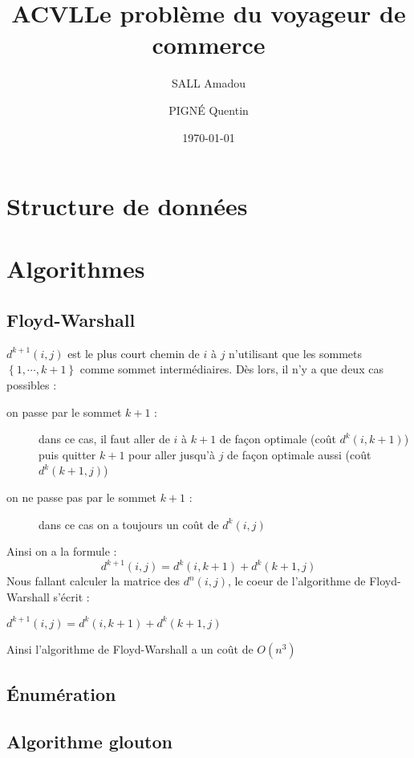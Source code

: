 \documentclass[11pt]{article}
\title{ACVL}
\title{Le problème du voyageur de commerce}
\author{SALL Amadou \and PIGN\'E Quentin }
\date{\today}
\newcommand{\set}[1]{\left\{#1\right\}}
\begin{document}
\maketitle

\section{Structure de données}
\section{Algorithmes}

\subsection*{Floyd-Warshall}
$d^{k+1}(i,j)$ est le plus court chemin de $i$ à $j$ n'utilisant que les sommets $\set{1,\cdots,k+1}$ comme sommet
intermédiaires. Dès lors, il n'y a que deux cas possibles :
\begin{description}
    \item[on passe par le sommet $k+1$ :]  dans ce cas, il faut aller de $i$ à $k+1$ de façon optimale (coût
  $d^{k}(i,k+1)$) puis quitter $k+1$ pour aller jusqu'à $j$ de façon optimale aussi (coût $d^{k}(k+1,j)$)
\item[on ne passe pas par le sommet $k+1$ :] dans ce cas on a toujours un coût de $d^{k}(i,j)$
\end{description}
Ainsi on a la formule :
\begin{displaymath}
  d^{k+1}(i,j) = d^{k}(i,k+1) + d^{k}(k+1,j) 
\end{displaymath}
Nous fallant calculer la matrice des $d^{n}(i,j)$, le coeur de l'algorithme de Floyd-Warshall s'écrit :
  \begin{algorithmic}[]
           \State $ d^{k+1}(i,j) = d^{k}(i,k+1) + d^{k}(k+1,j) $
           \EndFor
       \EndFor
   \EndFor
  \end{algorithmic}
Ainsi l'algorithme de Floyd-Warshall a un coût de $O(n^3)$

\subsection*{\'Enumération}

\subsection*{Algorithme glouton}
\end{document}
